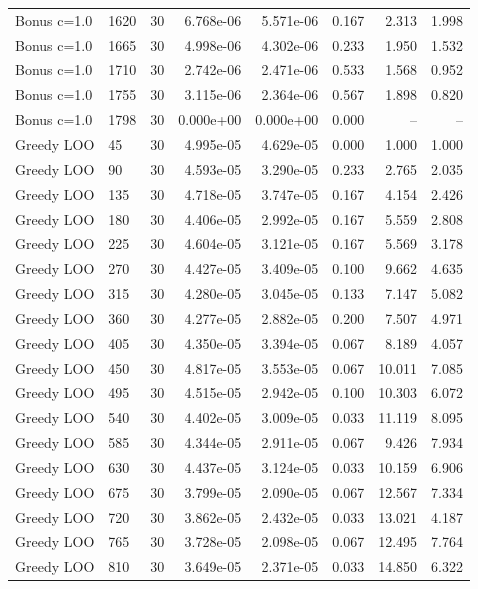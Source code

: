 \begin{scriptsize}
\begin{longtable}{llrrrrrr}
Bonus c=1.0 & 1620 & 30 & 6.768e-06 & 5.571e-06 & 0.167 & 2.313 & 1.998 \\
Bonus c=1.0 & 1665 & 30 & 4.998e-06 & 4.302e-06 & 0.233 & 1.950 & 1.532 \\
Bonus c=1.0 & 1710 & 30 & 2.742e-06 & 2.471e-06 & 0.533 & 1.568 & 0.952 \\
Bonus c=1.0 & 1755 & 30 & 3.115e-06 & 2.364e-06 & 0.567 & 1.898 & 0.820 \\
Bonus c=1.0 & 1798 & 30 & 0.000e+00 & 0.000e+00 & 0.000 & -- & -- \\
Greedy LOO & 45 & 30 & 4.995e-05 & 4.629e-05 & 0.000 & 1.000 & 1.000 \\
Greedy LOO & 90 & 30 & 4.593e-05 & 3.290e-05 & 0.233 & 2.765 & 2.035 \\
Greedy LOO & 135 & 30 & 4.718e-05 & 3.747e-05 & 0.167 & 4.154 & 2.426 \\
Greedy LOO & 180 & 30 & 4.406e-05 & 2.992e-05 & 0.167 & 5.559 & 2.808 \\
Greedy LOO & 225 & 30 & 4.604e-05 & 3.121e-05 & 0.167 & 5.569 & 3.178 \\
Greedy LOO & 270 & 30 & 4.427e-05 & 3.409e-05 & 0.100 & 9.662 & 4.635 \\
Greedy LOO & 315 & 30 & 4.280e-05 & 3.045e-05 & 0.133 & 7.147 & 5.082 \\
Greedy LOO & 360 & 30 & 4.277e-05 & 2.882e-05 & 0.200 & 7.507 & 4.971 \\
Greedy LOO & 405 & 30 & 4.350e-05 & 3.394e-05 & 0.067 & 8.189 & 4.057 \\
Greedy LOO & 450 & 30 & 4.817e-05 & 3.553e-05 & 0.067 & 10.011 & 7.085 \\
Greedy LOO & 495 & 30 & 4.515e-05 & 2.942e-05 & 0.100 & 10.303 & 6.072 \\
Greedy LOO & 540 & 30 & 4.402e-05 & 3.009e-05 & 0.033 & 11.119 & 8.095 \\
Greedy LOO & 585 & 30 & 4.344e-05 & 2.911e-05 & 0.067 & 9.426 & 7.934 \\
Greedy LOO & 630 & 30 & 4.437e-05 & 3.124e-05 & 0.033 & 10.159 & 6.906 \\
Greedy LOO & 675 & 30 & 3.799e-05 & 2.090e-05 & 0.067 & 12.567 & 7.334 \\
Greedy LOO & 720 & 30 & 3.862e-05 & 2.432e-05 & 0.033 & 13.021 & 4.187 \\
Greedy LOO & 765 & 30 & 3.728e-05 & 2.098e-05 & 0.067 & 12.495 & 7.764 \\
Greedy LOO & 810 & 30 & 3.649e-05 & 2.371e-05 & 0.033 & 14.850 & 6.322 \\

\end{longtable}
\end{scriptsize}
